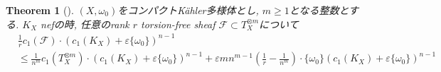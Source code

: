 \documentclass[dvipdfmx,a4paper,11pt]{article} %
\newtheorem{thm}{Theorem}[section]
\theoremstyle{definition}
\theoremstyle{remark}
\numberwithin{equation}{section}
\begin{document}
 \begin{thm}[{\cite[Theorem 1.1]{Eno88}}]
 \label{thm-Enoki-stability-tensor}
$(X, \omega_0)$をコンパクトK\"ahler多様体とし, $m \geq 1$となる整数とする. 
$K_X$ nefの時, 任意のrank $r$ torsion-free sheaf $\mathcal{F} \subset T_X^{\otimes m}$について
\begin{equation}
\label{eq-Enoki-stability-tensor}
\begin{aligned}
&\frac{1}{r}
c_1(\mathcal{F}) \cdot \left(c_1(K_X) + \varepsilon \{ \omega_0\} \right)^{n-1}
\\
&\leq
\frac{1}{n^m}
c_1(T_{X}^{\otimes m}) \cdot \left(c_1(K_X) + \varepsilon \{ \omega_0\} \right)^{n-1}
+
\varepsilon
m n^{m-1}\left( \frac{1}{r} - \frac{1}{n^m}\right)
\cdot \{ \omega_0\}
 \left(c_1(K_X) + \varepsilon \{ \omega_0\} \right)^{n-1}
\end{aligned}
\end{equation}
 \end{thm}
\end{document}
